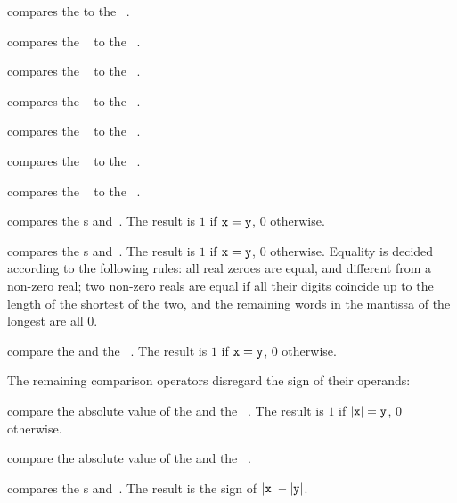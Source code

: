  compares the   to the
~.

 compares the ~ to the
~.

 compares the ~ to the
~.

 compares the ~ to the
~.

 compares the ~ to the
~.

 compares the ~ to the
~.

 compares the ~ to the
~.

 compares the s  and~.
The result is $1$ if ${\tt x} = {\tt y}$, $0$ otherwise.

 compares the s  and~.
The result is $1$ if ${\tt x} = {\tt y}$, $0$ otherwise. Equality is decided
according to the following rules: all real zeroes are equal, and
different from a non-zero real; two non-zero reals are equal if all their
digits coincide up to the length of the shortest of the two, and the
remaining words in the mantissa of the longest are all $0$.


 compare the   and
the ~. The result is $1$ if ${\tt x} = {\tt y}$, $0$ otherwise.

The remaining comparison operators disregard the sign of their operands:


 compare the absolute value of the
  and the ~. The result is $1$ if
$|{\tt x}| = {\tt y}$, $0$ otherwise.


 compare the absolute value of the
  and the ~.

 compares the s  and~.
The result is the sign of $|{\tt x}| - |{\tt y}|$.

